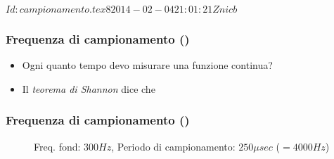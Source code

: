 %
%
%
%
%
\svnInfo $Id: campionamento.tex 8 2014-02-04 21:01:21Z nicb $

\setcounter{ms}{1}
\begin{frame}
    \frametitle{Frequenza di campionamento ()}

	\begin{itemize}[<+- | alert@+->]

      \item Ogni quanto tempo devo misurare una funzione continua?

      \item Il \emph{teorema di Shannon} dice che
          
        \vspace{2ex}
       \begin{quote}
      \end{quote}

	\end{itemize}

\end{frame}

\begin{frame}
    \frametitle{Frequenza di campionamento ()}

		\begin{center}
    \begin{figure}
      \caption{\scriptsize Freq. fond: $300 Hz$, Periodo di campionamento: $250 {\mu}sec$ ($= 4000 Hz$)}
    \end{figure}
		\end{center}

\end{frame}


